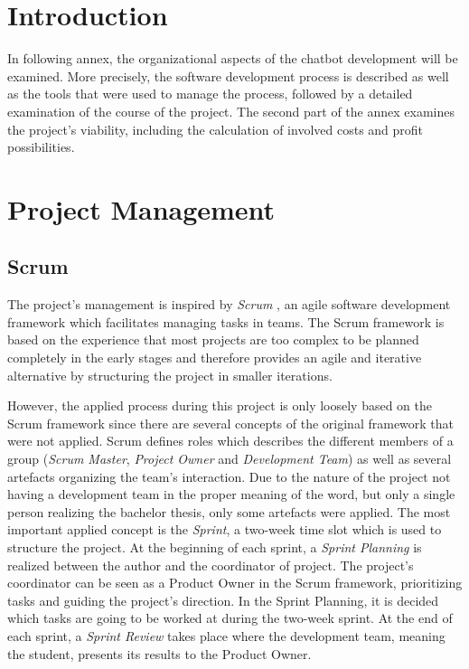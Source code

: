 
\section{Introduction}
In following annex, the organizational aspects of the chatbot development will be examined. More precisely, the software development process is described as well as the tools that were used to manage the process, followed by a detailed examination of the course of the project.
The second part of the annex examines the project’s viability, including the calculation of involved costs and profit possibilities.

\section{Project Management}
\subsection{Scrum}
The project’s management is inspired by \textit{Scrum}  \cite{scrum}, an agile software development framework which facilitates managing tasks in teams. The Scrum framework is based on the experience that most projects are too complex to be planned completely in the early stages and therefore provides an agile and iterative alternative by structuring the project in smaller iterations.

However, the applied process during this project is only loosely based on the Scrum framework since there are several concepts of the original framework that were not applied. Scrum defines roles which describes the different members of a group (\textit{Scrum Master}, \textit{Project Owner} and \textit{Development Team}) as well as several artefacts organizing the team’s interaction. Due to the nature of the project not having a development team in the proper meaning of the word, but only a single person realizing the bachelor thesis, only some artefacts were applied. The most important applied concept is the \textit{Sprint}, a two-week time slot which is used to structure the project. At the beginning of each sprint, a \textit{Sprint Planning} is realized between the author and the coordinator of project. The project’s coordinator can be seen as a Product Owner in the Scrum framework, prioritizing tasks and guiding the project’s direction. In the Sprint Planning, it is decided which tasks are going to be worked at during the two-week sprint. At the end of each sprint, a \textit{Sprint Review} takes place where the development team, meaning the student, presents its results to the Product Owner.

